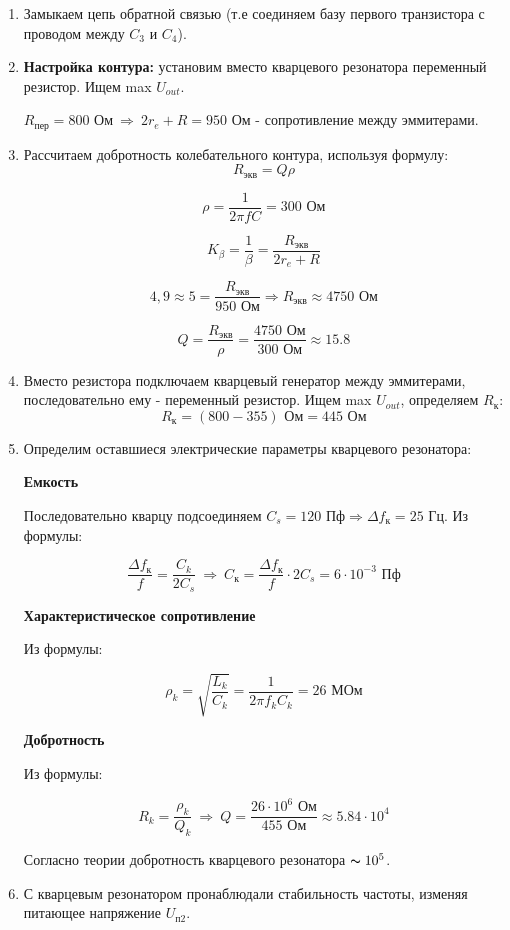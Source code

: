 \begin{enumerate}
    \item Замыкаем цепь обратной связью (т.е соединяем базу первого транзистора с проводом между $C_3$ и $C_4$).
    
    \item \textbf{Настройка контура:} установим вместо кварцевого резонатора переменный резистор. Ищем max $U_{out}$.
    
    $R_{пер} = 800 \text{ Ом} \: \Rightarrow \: 2r_e + R = 950 \text{ Ом}$ - сопротивление между эммитерами.  
    
    \item Рассчитаем добротность колебательного контура, используя формулу:
    \[ R_{экв} = Q\rho \]

    \[ \rho = \frac{1}{2\pi f C} = 300 \text{ Ом} \] 
    
    \[ K_{\beta} = \frac{1}{\beta} = \frac{R_{экв}}{2r_e + R} \]

    \[ {4,9} \approx 5 = \frac{R_{экв}}{950 \text{ Ом}} \Rightarrow R_{экв} \approx 4750 \text{ Ом} \]

    \[ Q = \frac{R_{экв}}{\rho} = \frac{4750 \text{ Ом}}{300 \text{ Ом}} \approx 15.8 \]

    \item Вместо резистора подключаем кварцевый генератор между эммитерами, последовательно ему - переменный резистор. Ищем max $U_{out}$, определяем $R_к$:
    \[ R_к = (800 - 355) \text{ Ом} = 445  \text{ Ом}\]

    \item Определим оставшиеся электрические параметры кварцевого резонатора:
    
    \textbf{Емкость}

    Последовательно кварцу подсоединяем $C_s = 120 \text{ Пф} \Rightarrow \Delta f_к = 25 \text{ Гц}$.
    Из формулы:

    \[ \frac{\Delta f_к}{f} = \frac{C_k}{2C_s} \: \Rightarrow \: C_{к} = \frac{\Delta f_к}{f} \cdot 2C_s = 6 \cdot 10^{-3} \text{ Пф} \]

    \textbf{Характеристическое сопротивление}

    Из формулы:

    \[ \rho_k = \sqrt{\frac{L_k}{C_k}} = \frac{1}{2\pi f_k C_k} = 26  \text{ МОм}\]

    \textbf{Добротность}
    
    Из формулы:

    \[ R_k = \frac{\rho_k}{Q_k} \: \Rightarrow \: Q = \frac{26 \cdot 10^6 \text{ Ом}}{455 \text{ Ом}} \approx 5.84 \cdot 10^{4} \]

    Согласно теории добротность кварцевого резонатора $\thicksim 10^{5}$.

    \item С кварцевым резонатором пронаблюдали стабильность частоты, изменяя питающее напряжение $U_{п2}$.
    
\end{enumerate}

